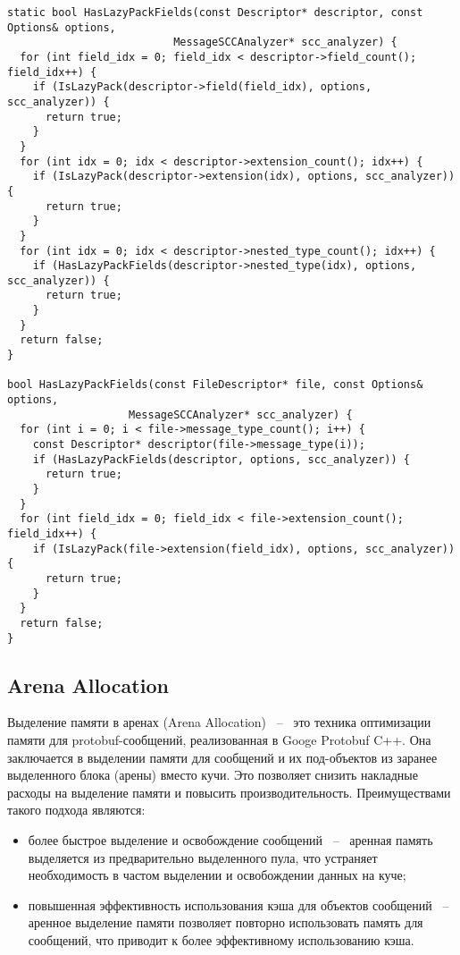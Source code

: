 \noindent\begin{minipage}{\linewidth}
\begin{lstlisting}[style=CodeListing, label=sec_impl:code:has_lazy_pack, caption={Функции для определения опции lazy\_pack у полей сообщения}]
static bool HasLazyPackFields(const Descriptor* descriptor, const Options& options,
                          MessageSCCAnalyzer* scc_analyzer) {
  for (int field_idx = 0; field_idx < descriptor->field_count(); field_idx++) {
    if (IsLazyPack(descriptor->field(field_idx), options, scc_analyzer)) {
      return true;
    }
  }
  for (int idx = 0; idx < descriptor->extension_count(); idx++) {
    if (IsLazyPack(descriptor->extension(idx), options, scc_analyzer)) {
      return true;
    }
  }
  for (int idx = 0; idx < descriptor->nested_type_count(); idx++) {
    if (HasLazyPackFields(descriptor->nested_type(idx), options, scc_analyzer)) {
      return true;
    }
  }
  return false;
}

bool HasLazyPackFields(const FileDescriptor* file, const Options& options,
                   MessageSCCAnalyzer* scc_analyzer) {
  for (int i = 0; i < file->message_type_count(); i++) {
    const Descriptor* descriptor(file->message_type(i));
    if (HasLazyPackFields(descriptor, options, scc_analyzer)) {
      return true;
    }
  }
  for (int field_idx = 0; field_idx < file->extension_count(); field_idx++) {
    if (IsLazyPack(file->extension(field_idx), options, scc_analyzer)) {
      return true;
    }
  }
  return false;
}

\end{lstlisting}
\end{minipage}
\vspace{-1em}
\subsection{Arena Allocation}

Выделение памяти в аренах (Arena Allocation) ~--~ это техника оптимизации памяти для protobuf-сообщений, реализованная в Googe Protobuf C++. 
Она заключается в выделении памяти для сообщений и их под-объектов из заранее выделенного блока (арены) вместо кучи.
Это позволяет снизить накладные расходы на выделение памяти и повысить производительность.
\pagebreak
Преимуществами такого подхода являются:
\begin{itemize}
    \item более быстрое выделение и освобождение сообщений ~--~ аренная память выделяется из предварительно выделенного пула, что устраняет необходимость в частом выделении и освобождении данных на куче;
    \item повышенная эффективность использования кэша для объектов сообщений ~--~ аренное выделение памяти позволяет повторно использовать память для сообщений, что приводит к более эффективному использованию кэша.
\end{itemize}

